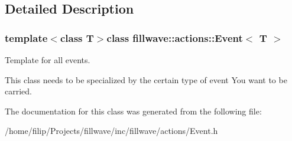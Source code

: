 \subsection{Detailed Description}
\subsubsection*{template$<$class T$>$class fillwave\+::actions\+::\+Event$<$ T $>$}

Template for all events. 

This class needs to be specialized by the certain type of event You want to be carried. 

The documentation for this class was generated from the following file\+:\begin{DoxyCompactItemize}
\item 
/home/filip/\+Projects/fillwave/inc/fillwave/actions/Event.\+h\end{DoxyCompactItemize}
